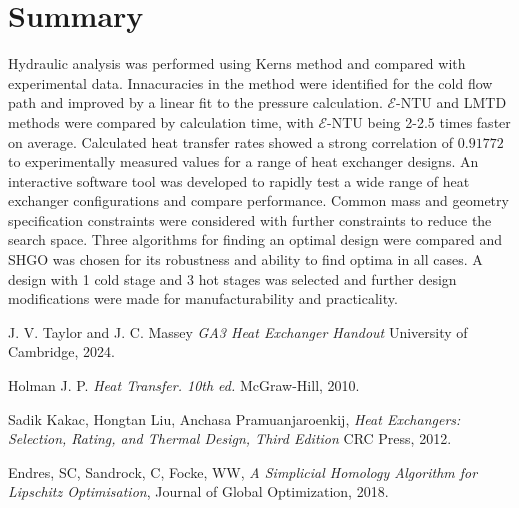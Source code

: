 \documentclass{article}
\begin{document}
\section{Summary}

Hydraulic analysis was performed using Kerns method and compared with experimental data.
Innacuracies in the method were identified for the cold flow path and improved by a linear fit to the pressure calculation.
$\mathcal{E}$-NTU and LMTD methods were compared by calculation time, with $\mathcal{E}$-NTU being 2-2.5 times faster on average.
Calculated heat transfer rates showed a strong correlation of $\mathbf{0.91772}$ to experimentally measured values for a range of heat exchanger designs.
An interactive software tool was developed to rapidly test a wide range of heat exchanger configurations and compare performance.
Common mass and geometry specification constraints were considered with further constraints to reduce the search space.
Three algorithms for finding an optimal design were compared and SHGO was chosen for its robustness and ability to find optima in all cases.
A design with 1 cold stage and 3 hot stages was selected and further design modifications were made for manufacturability and practicality.



\begin{thebibliography}{9}


  J. V. Taylor and J. C. Massey
  \emph{GA3 Heat Exchanger Handout}
  University of Cambridge,
  2024.

  Holman J. P.
  \emph{Heat Transfer. 10th ed.}
  McGraw-Hill,
  2010.

  Sadik Kakac, Hongtan Liu, Anchasa Pramuanjaroenkij,
  \emph{Heat Exchangers: Selection, Rating, and Thermal Design, Third Edition}
  CRC Press,
  2012.

  Endres, SC, Sandrock, C, Focke, WW,
  \emph{A Simplicial Homology Algorithm for Lipschitz Optimisation},
  Journal of Global Optimization,
  2018.

\end{thebibliography}
\end{document}

